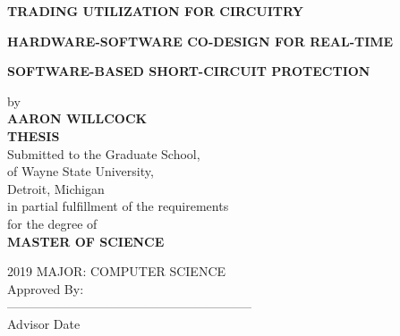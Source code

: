 \centerline{\bf TRADING UTILIZATION FOR CIRCUITRY}
\vspace{-0.4cm}
\centerline{\bf HARDWARE-SOFTWARE CO-DESIGN FOR REAL-TIME}
\vspace{-0.4cm}
\centerline{\bf SOFTWARE-BASED SHORT-CIRCUIT PROTECTION}

\vskip-0.4cm

\thispagestyle{empty}

\begin{center}
    \vspace{-0.4cm}
    by \\
    {\bf AARON WILLCOCK}\\ %
    {\bf THESIS}\\
    Submitted to the Graduate School,\\
    of Wayne State University,\\
    Detroit, Michigan\\
    in partial fulfillment of the requirements\\
    for the degree of\\
    {\bf MASTER OF SCIENCE}
\end{center}

\begin{flushleft}
    \vspace*{-0.20in}
    \hspace*{3.09in}2019 %
    \hspace*{3.09in}MAJOR: COMPUTER SCIENCE\\ %
    \hspace*{3.09in}Approved By:\\
    \hspace*{3.09in}-----------------------------------------------------------\\
    \vspace*{-0.25in}
    \hspace*{3.09in}Advisor\hspace*{1.5in} Date\hspace*{0.1in}\\
\end{flushleft}

